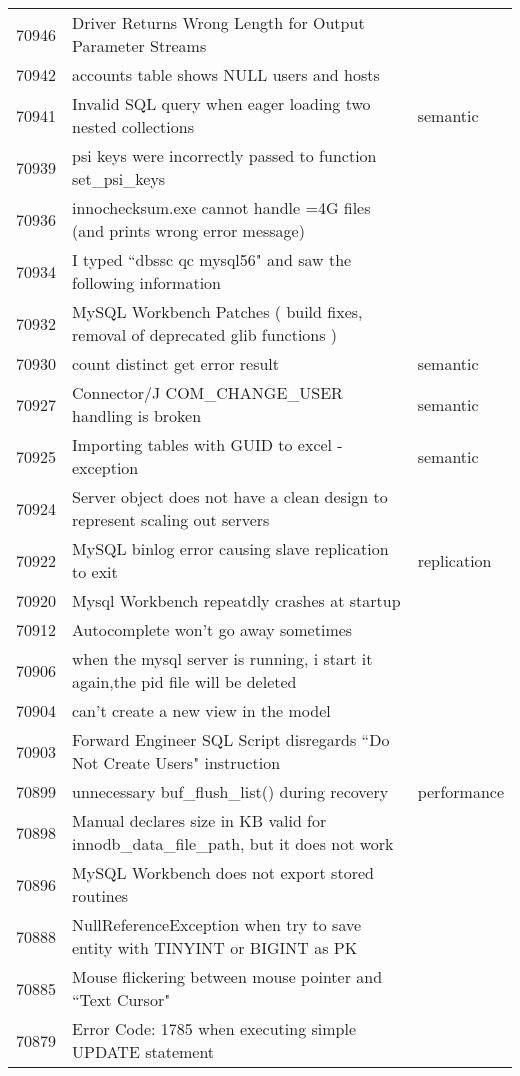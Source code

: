 \begin{longtable}[c]{p{1cm}p{10cm}p{1cm}}
70946 & Driver Returns Wrong Length for Output Parameter Streams &  \\
70942 & accounts table shows NULL users and hosts &  \\
70941 & Invalid SQL query when eager loading two nested collections & semantic \\
70939 & psi keys were incorrectly passed to function set\_psi\_keys &  \\
70936 & innochecksum.exe cannot handle =4G files (and prints wrong error message) &  \\
70934 & I typed ``dbssc qc mysql56" and saw the following information &  \\
70932 & MySQL Workbench Patches ( build fixes, removal of deprecated glib functions ) &  \\
70930 & count distinct get error result & semantic \\
70927 & Connector/J COM\_CHANGE\_USER handling is broken & semantic \\
70925 & Importing tables with GUID to excel - exception & semantic \\
70924 & Server object does not have a clean design to represent scaling out servers &  \\
70922 & MySQL binlog error causing slave replication to exit & replication \\
70920 & Mysql Workbench repeatdly crashes at startup &  \\
70912 & Autocomplete won't go away sometimes &  \\
70906 & when the mysql server is running, i start it again,the pid file will be deleted &  \\
70904 & can't create a new view in the model &  \\
70903 & Forward Engineer SQL Script disregards ``Do Not Create Users" instruction &  \\
70899 & unnecessary buf\_flush\_list() during recovery & performance \\
70898 & Manual declares size in KB valid for innodb\_data\_file\_path, but it does not work &  \\
70896 & MySQL Workbench does not export stored routines &  \\
70888 & NullReferenceException when try to save entity with TINYINT or BIGINT as PK &  \\
70885 & Mouse flickering between mouse pointer and ``Text Cursor" &  \\
70879 & Error Code: 1785 when executing simple UPDATE statement &  \\

\end{longtable}
